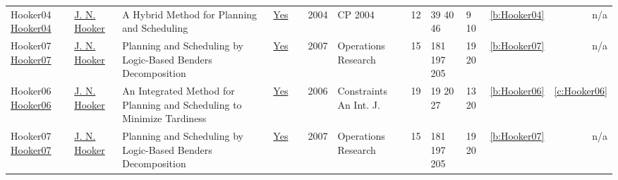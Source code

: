 {\begin{longtable}{>{\raggedright\arraybackslash}p{3cm}>{\raggedright\arraybackslash}p{4.5cm}>{\raggedright\arraybackslash}p{6.0cm}rrrp{2.5cm}rp{1cm}p{1cm}rr}
Hooker04 \href{https://doi.org/10.1007/978-3-540-30201-8_24}{Hooker04} & \hyperref[auth:a160]{J. N. Hooker} & \cellcolor{green!10}A Hybrid Method for Planning and Scheduling & \href{../works/Hooker04.pdf}{Yes} & \cite{Hooker04} & 2004 & CP 2004 & 12 & 39 40 46 & 9 10 & \ref{b:Hooker04} & n/a\\
Hooker07 \href{http://dx.doi.org/10.1287/opre.1060.0371}{Hooker07} & \hyperref[auth:a160]{J. N. Hooker} & Planning and Scheduling by Logic-Based Benders Decomposition & \href{../works/Hooker07.pdf}{Yes} & \cite{Hooker07} & 2007 & Operations Research & 15 & 181 197 205 & 19 20 & \ref{b:Hooker07} & n/a\\
Hooker06 \href{https://doi.org/10.1007/s10601-006-8060-2}{Hooker06} & \hyperref[auth:a160]{J. N. Hooker} & \cellcolor{green!10}An Integrated Method for Planning and Scheduling to Minimize Tardiness & \href{../works/Hooker06.pdf}{Yes} & \cite{Hooker06} & 2006 & Constraints An Int. J. & 19 & 19 20 27 & 13 20 & \ref{b:Hooker06} & \ref{c:Hooker06}\\
Hooker07 \href{http://dx.doi.org/10.1287/opre.1060.0371}{Hooker07} & \hyperref[auth:a160]{J. N. Hooker} & Planning and Scheduling by Logic-Based Benders Decomposition & \href{../works/Hooker07.pdf}{Yes} & \cite{Hooker07} & 2007 & Operations Research & 15 & 181 197 205 & 19 20 & \ref{b:Hooker07} & n/a\\
\end{longtable}
}

